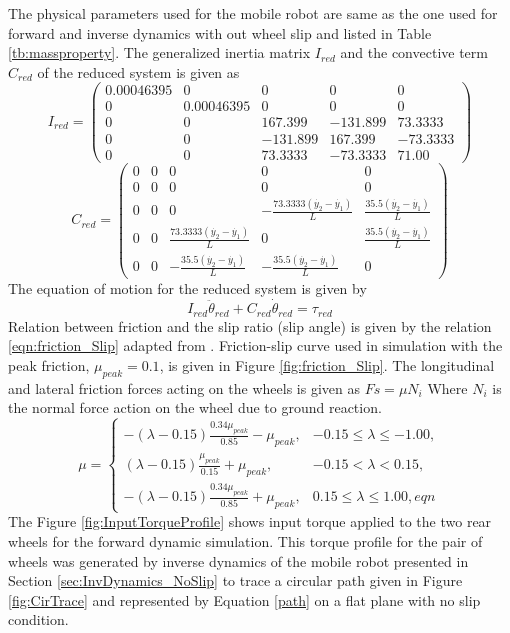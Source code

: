 {The physical parameters used for the mobile robot are same as the one used for forward and inverse dynamics with out wheel slip and listed in Table \ref{tb:massproperty}.
The generalized inertia  matrix $I_{red}$  and the convective term $ C_{red}$ of the reduced system is given as
\begin{equation}
I_{red}=\left(
\begin{array}{ccccc}
0.00046395 & 0 & 0 & 0 & 0 \\
0 & 0.00046395 & 0 & 0 & 0 \\
0 & 0 & 167.399 & -131.899 & 73.3333 \\
0 & 0 & -131.899 & 167.399 & -73.3333 \\
0 & 0 & 73.3333 & -73.3333 & 71.00
\end{array}
\right)
\end{equation}
\begin{equation}
C_{red}=\left(
\begin{array}{ccccc}
0 & 0 & 0 & 0 & 0 \\
0 & 0 & 0 & 0 & 0 \\
0 & 0 & 0 & -\frac{73.3333 (\dot{y_2} - \dot{y_1})}{L} & \frac{35.5 (\dot{y_2} - \dot{y_1})}{L} \\
0 & 0 & \frac{73.3333 (\dot{y_2} - \dot{y_1})}{L} & 0 & \frac{35.5 (\dot{y_2} - \dot{y_1})}{L} \\
0 & 0 & -\frac{35.5 (\dot{y_2} - \dot{y_1})}{L} & -\frac{35.5 (\dot{y_2} - \dot{y_1})}{L} & 0
\end{array}
\right)
\end{equation}
The equation of motion for the reduced system is given by 
\begin{equation}
I_{red}\ddot{\theta}_{red}+C_{red}\dot{\theta}_{red}=\tau_{red}
\end{equation}
Relation between friction and the  slip ratio (slip angle)  is given by the relation  \ref{eqn:friction_Slip} adapted from \cite{balakrishna1995modeling}.  Friction-slip curve used in simulation with the peak friction, $\mu_{peak}=0.1$, is given in  Figure \ref{fig:friction_Slip}. The longitudinal and lateral friction forces acting on the wheels is given as $Fs=\mu N_i$ Where $N_i$ is the normal force action on the wheel due to ground reaction.
\begin{equation}
\label{eqn:friction_Slip}
\mu =
\begin{cases}
-(\lambda-0.15)\frac{0.34\mu_{peak}}{0.85}-\mu_{peak}, & -0.15\le\lambda \le -1.00,\\
(\lambda-0.15)\frac{\mu_{peak}}{0.15}+\mu_{peak}, & -0.15<\lambda<0.15,
\\
-(\lambda-0.15)\frac{0.34\mu_{peak}}{0.85}+\mu_{peak}, & 0.15\le\lambda \le 1.00,
eqn
\end{cases}
\end{equation}
The Figure \ref{fig:InputTorqueProfile} shows input torque applied to the two rear wheels for the forward dynamic simulation. This torque profile for the pair of  wheels was generated by inverse dynamics  of the mobile robot presented in Section \ref{sec:InvDynamics_NoSlip} to trace a circular path given in Figure \ref{fig:CirTrace} and represented by Equation \ref{path} on a flat plane with  no slip condition. 

}
